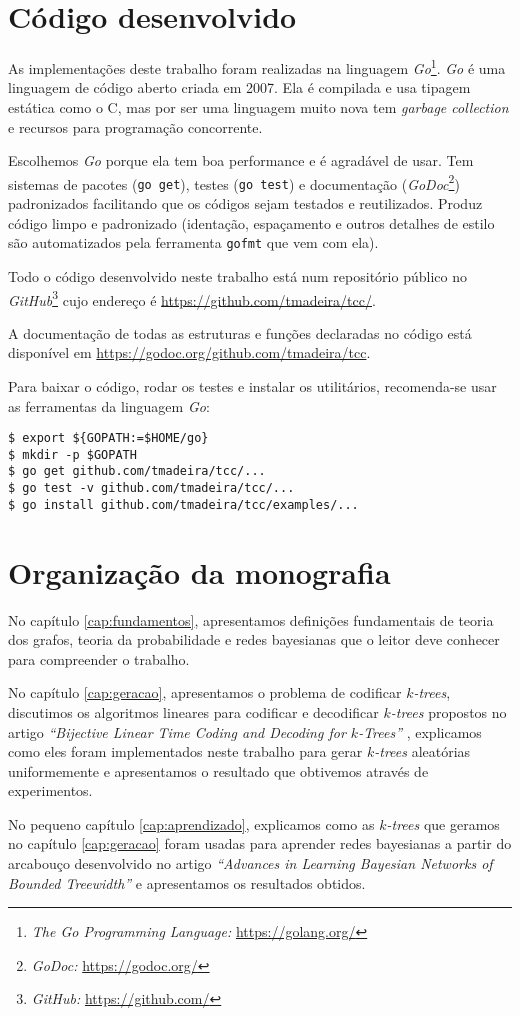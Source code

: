 \section{Código desenvolvido}

As implementações deste trabalho foram realizadas na linguagem \emph{Go}\footnote{\emph{The Go Programming Language:} \url{https://golang.org/}}. \emph{Go} é uma linguagem de código aberto criada em 2007. Ela é compilada e usa tipagem estática como o C, mas por ser uma linguagem muito nova tem \emph{garbage collection} e recursos para programação concorrente.

Escolhemos \emph{Go} porque ela tem boa performance e é agradável de usar. Tem sistemas de pacotes ({\tt go get}), testes ({\tt go test}) e documentação (\emph{GoDoc}\footnote{\emph{GoDoc:} \url{https://godoc.org/}}) padronizados facilitando que os códigos sejam testados e reutilizados. Produz código limpo e padronizado (identação, espaçamento e outros detalhes de estilo são automatizados pela ferramenta {\tt gofmt} que vem com ela).

Todo o código desenvolvido neste trabalho está num repositório público no \emph{GitHub}\footnote{\emph{GitHub:} \url{https://github.com/}} cujo endereço é \url{https://github.com/tmadeira/tcc/}.

A documentação de todas as estruturas e funções declaradas no código está disponível em \url{https://godoc.org/github.com/tmadeira/tcc}.

Para baixar o código, rodar os testes e instalar os utilitários, recomenda-se usar as ferramentas da linguagem \emph{Go}:

\begin{lstlisting}
$ export ${GOPATH:=$HOME/go}
$ mkdir -p $GOPATH
$ go get github.com/tmadeira/tcc/...
$ go test -v github.com/tmadeira/tcc/...
$ go install github.com/tmadeira/tcc/examples/...
\end{lstlisting}

\section{Organização da monografia}

No capítulo \ref{cap:fundamentos}, apresentamos definições fundamentais de teoria dos grafos, teoria da probabilidade e redes bayesianas que o leitor deve conhecer para compreender o trabalho.

No capítulo \ref{cap:geracao}, apresentamos o problema de codificar \emph{$k$-trees}, discutimos os algoritmos lineares para codificar e decodificar \emph{$k$-trees} propostos no artigo \emph{``Bijective Linear Time Coding and Decoding for $k$-Trees''} \cite{caminiti}, explicamos como eles foram implementados neste trabalho para gerar \emph{$k$-trees} aleatórias uniformemente e apresentamos o resultado que obtivemos através de experimentos.

No pequeno capítulo \ref{cap:aprendizado}, explicamos como as \emph{$k$-trees} que geramos no capítulo \ref{cap:geracao} foram usadas para aprender redes bayesianas a partir do arcabouço desenvolvido no artigo \emph{``Advances in Learning Bayesian Networks of Bounded Treewidth''} \cite{maua} e apresentamos os resultados obtidos.

